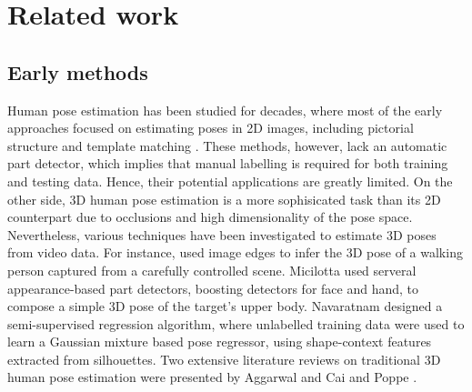 \section{Related work}
\label{sec/body/review}

\subsection{Early methods} 

Human pose estimation has been studied for decades, where most of the early approaches focused on estimating poses in 2D images, including pictorial structure \cite{Fischler1973} and template matching \cite{Ioffe1999}. These methods, however, lack an automatic part detector, which implies that manual labelling is required for both training and testing data. Hence, their potential applications are greatly limited.
On the other side, 3D human pose estimation is a more sophisicated task than its 2D counterpart due to occlusions and high dimensionality of the pose space. Nevertheless, various techniques have been investigated to estimate 3D poses from video data. For instance, \cite{Hogg1983} used image edges to infer the 3D pose of a walking person captured from a carefully controlled scene. 
Micilotta \etal \cite{Micilotta2006} used serveral appearance-based part detectors, \eg boosting detectors for face and hand, to compose a simple 3D pose of the target's upper body. 
Navaratnam \etal \cite{Navaratnam2006} designed a semi-supervised regression algorithm, where unlabelled training data were used to learn a Gaussian mixture based pose regressor, using shape-context features extracted from silhouettes. Two extensive literature reviews on traditional 3D human pose estimation were presented by Aggarwal and Cai \cite{Aggarwal1999} and Poppe \cite{Poppe2007}. 


